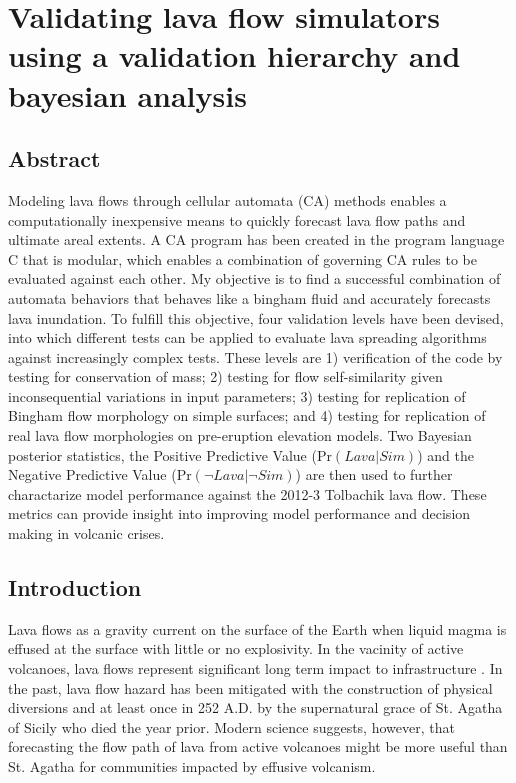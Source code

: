 \chapter[Validating lava flow simulators using a validation hierarchy and bayesian analysis]{Validating lava flow simulators using a validation hierarchy and bayesian analysis}\label{ch_molasses}

\renewcommand*{\FigPath}{figures/chapter-molasses}

\section*{Abstract}
	Modeling lava flows through cellular automata (CA) methods enables a computationally inexpensive means to quickly forecast lava flow paths and ultimate areal extents. A CA program has been created in the program language C that is modular, which enables a combination of governing CA rules to be evaluated against each other. My objective is to find a successful combination of automata behaviors that behaves like a bingham fluid and accurately forecasts lava inundation. To fulfill this objective, four validation levels have been devised, into which different tests can be applied to evaluate lava spreading algorithms against increasingly complex tests. These levels are 1) verification of the code by testing for conservation of mass; 2) testing for flow self-similarity given inconsequential variations in input parameters; 3) testing for replication of Bingham flow morphology on simple surfaces; and 4) testing for replication of real lava flow morphologies on pre-eruption elevation models. Two Bayesian posterior statistics, the Positive Predictive Value ($\text{Pr}(Lava|Sim)$) and the Negative Predictive Value ($\text{Pr}(\neg Lava|\neg Sim)$) are then used to further charactarize model performance against the 2012-3 Tolbachik lava flow. These metrics can provide insight into improving model performance and decision making in volcanic crises.

\section{Introduction}
	Lava flows as a gravity current on the surface of the Earth when liquid magma is effused at the surface with little or no explosivity. In the vacinity of active volcanoes, lava flows represent significant long term impact to infrastructure \citep{peterson2000lava}. In the past, lava flow hazard has been mitigated with the construction of physical diversions and at least once in 252 A.D. by the supernatural grace of St. Agatha of Sicily who died the year prior. Modern science suggests, however, that forecasting the flow path of lava from active volcanoes might be more useful than St. Agatha for communities impacted by effusive volcanism.

